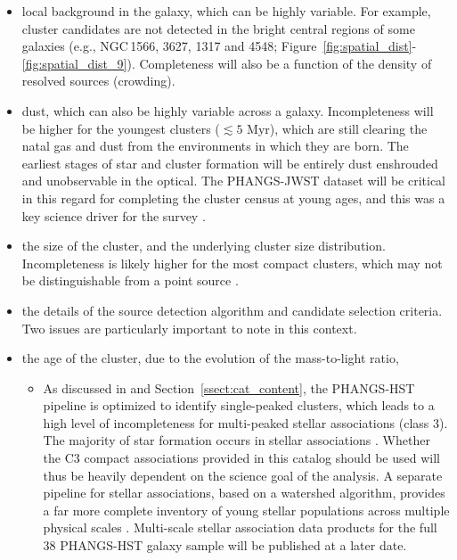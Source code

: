 \documentclass[]{aastex631}
\begin{document}
\begin{itemize}
    \item local background in the galaxy, which can be highly variable.  For example, cluster candidates are not detected in the bright central regions of some galaxies (e.g., NGC\,1566, 3627, 1317 and 4548; Figure~\ref{fig:spatial_dist}-\ref{fig:spatial_dist_9}). Completeness will also be a function of the density of resolved sources (crowding).
    \item dust, which can also be highly variable across a galaxy.  Incompleteness will be higher for the youngest clusters ($\lesssim5$ Myr), which are still clearing the natal gas and dust from the environments in which they are born.  The earliest stages of star and cluster formation will be entirely dust enshrouded and unobservable in the optical.   The PHANGS-JWST dataset will be critical in this regard for completing the cluster census at young ages, and this was a key science driver for the survey \citep[][and references therein]{lee_phangs-jwst_2023}.
    \item the size of the cluster, and the underlying cluster size distribution.  Incompleteness is likely higher for the most compact clusters, which may not be distinguishable from a point source \citep[e.g.,][]{ryon_effective_2017, brown_radii_2021}.  
    \item the details of the source detection algorithm and candidate selection criteria.  Two issues are particularly important to note in this context.
    \item the age of the cluster, due to the evolution of the mass-to-light ratio,
    \begin{itemize}
    \item As discussed in \citet{lee_phangs-hst_2022} and Section~\ref{ssect:cat_content}, the PHANGS-HST pipeline is optimized to identify single-peaked clusters, which leads to a high level of incompleteness for multi-peaked stellar associations (class 3).  The majority of star formation occurs in stellar associations \citep[][and references therein]{lada03,ward18, ward20, wright20}.  Whether the C3 compact associations provided in this catalog should be used will thus be heavily dependent on the science goal of the analysis. A separate pipeline for stellar associations, based on a watershed algorithm, provides a far more complete inventory of young stellar populations across multiple physical scales \citep{larson_multiscale_2023}. Multi-scale stellar association data products for the full 38 PHANGS-HST galaxy sample will be published at a later date.  

\end{itemize}
\end{itemize}
\end{document}
